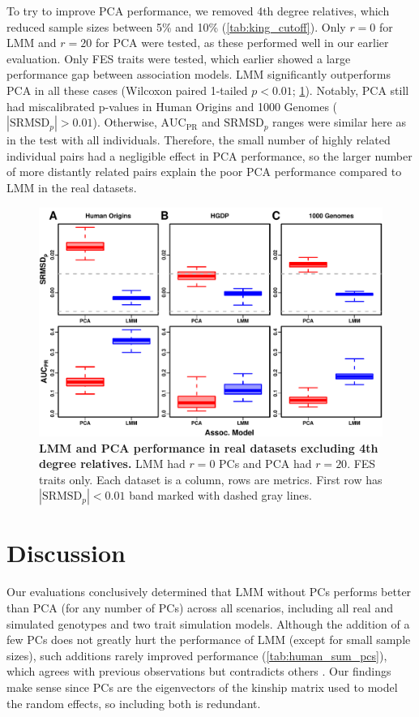 \documentclass[11pt]{article}
\newcommand{\rmsd}{\text{SRMSD}_p}
\newcommand{\auc}{\text{AUC}_\text{PR}}
\begin{document}
To try to improve PCA performance, we removed 4th degree relatives, which reduced sample sizes between 5\% and 10\% (\cref{tab:king_cutoff}).
Only $r=0$ for LMM and $r=20$ for PCA were tested, as these performed well in our earlier evaluation.
Only FES traits were tested, which earlier showed a large performance gap between association models.
LMM significantly outperforms PCA in all these cases (Wilcoxon paired 1-tailed $p < 0.01$; \cref{fig:king_cutoff}).
Notably, PCA still had miscalibrated p-values in Human Origins and 1000 Genomes ($|\rmsd| > 0.01$).
Otherwise, $\auc$ and $\rmsd$ ranges were similar here as in the test with all individuals.
Therefore, the small number of highly related individual pairs had a negligible effect in PCA performance, so the larger number of more distantly related pairs explain the poor PCA performance compared to LMM in the real datasets.

\begin{figure}[bp!]
  \centering
  \includegraphics[width=\textwidth]{fes/rmsd-auc_king-cutoff-4.pdf}
  \caption{
    {\bf LMM and PCA performance in real datasets excluding 4th degree relatives.}
    LMM had $r=0$ PCs and PCA had $r=20$.
    FES traits only.
    Each dataset is a column, rows are metrics.
    First row has $|\rmsd| < 0.01$ band marked with dashed gray lines.
  }
  \label{fig:king_cutoff}
\end{figure}


\section{Discussion}

Our evaluations conclusively determined that LMM without PCs performs better than PCA (for any number of PCs) across all scenarios, including all real and simulated genotypes and two trait simulation models.
Although the addition of a few PCs does not greatly hurt the performance of LMM (except for small sample sizes), such additions rarely improved performance (\cref{tab:human_sum_pcs}), which agrees with previous observations \citep{liu_controlling_2011} but contradicts others \citep{zhao_arabidopsis_2007, price_new_2010}.
Our findings make sense since PCs are the eigenvectors of the kinship matrix used to model the random effects, so including both is redundant.
\end{document}
